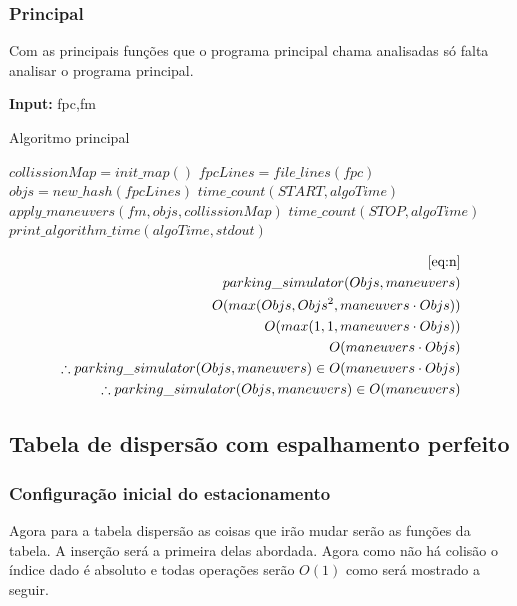 \documentclass[11pt]{article}
\begin{document}
\subsubsection{Principal}
\label{sec:org6cd6ca2}
Com as principais funções que o programa principal chama analisadas só falta analisar o programa principal. 

\begin{algorithm}
\textbf{Input:} fpc,fm
\caption{Algoritmo principal}\label{algorithmdpsmudar}
\begin{algorithmic}[1]
\State $collissionMap = init\_map()$
\State $fpcLines = file\_lines(fpc)$
\State $objs = new\_hash(fpcLines)$
\State $time\_count(START,algoTime)$
\State $apply\_maneuvers(fm,objs,collissionMap)$
\State $time\_count(STOP,algoTime)$
\State $print\_algorithm\_time(algoTime,stdout)$
\EndIf
\EndProcedure
\end{algorithmic}
\end{algorithm}

\begin{equation}
\begin{aligned}
\eqref{eq:n}\\
parking\_simulator(Objs,maneuvers)\\
O(max(Objs,Objs^{2},maneuvers\cdot Objs))\\
O(max(1,1,maneuvers\cdot Objs))\\
O(maneuvers\cdot Objs)\\
\therefore parking\_simulator(Objs,maneuvers) \in O(maneuvers\cdot Objs)\\
\therefore parking\_simulator(Objs,maneuvers) \in O(maneuvers)\\
\end{aligned}
\end{equation}

\subsection{Tabela de dispersão com espalhamento perfeito}
\label{sec:org957f9f5}
\subsubsection{Configuração inicial do estacionamento}
\label{sec:orga752d18}
Agora para a tabela dispersão as coisas que irão mudar serão as funções da tabela. A inserção será a primeira delas abordada. Agora como não há colisão o índice dado é absoluto e todas operações serão \(O(1)\) como será mostrado a seguir.
\end{document}
